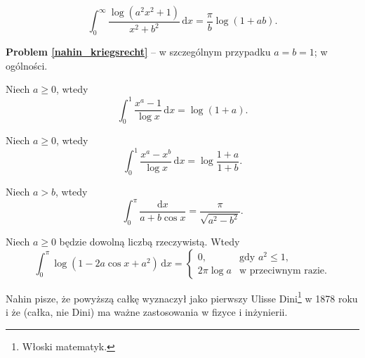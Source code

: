 \begin{problem}
    \label{nahin_kriegsrecht}
    \begin{equation}
        \int_0^\infty \frac{\log (a^2 x^2 + 1)}{x^2 + b^2} \,\mathrm{d}x = \frac \pi b \log (1 + ab).
    \end{equation}
\end{problem}

\textbf{Problem \ref{nahin_kriegsrecht}} -- \cite[s. 67]{nahin15} w szczególnym przypadku $a = b = 1$; \cite[s. 114, 375]{nahin15} w ogólności.

\begin{problem}
    Niech $a \ge 0$, wtedy
    \begin{equation}
        \int_0^1 \frac{x^a - 1}{\log x} \,\mathrm{d}x = \log(1+a).
    \end{equation}
\end{problem}

\begin{problem}
    Niech $a \ge 0$, wtedy
    \begin{equation}
        \int_0^1 \frac{x^a - x^b}{\log x} \,\mathrm{d}x = \log \frac{1+a}{1+b}.
    \end{equation}
\end{problem}

\begin{problem}
    Niech $a > b$, wtedy
    \begin{equation}
        \int_0^\pi \frac{\mathrm{d}x} {a + b \cos x} = \frac{\pi}{\sqrt{a^2 - b^2}}.
    \end{equation}
\end{problem}

\begin{problem}
    \label{nahin_dini}%
    Niech $a \ge 0$ będzie dowolną liczbą rzeczywistą.
    Wtedy
    \begin{equation}
        \int_0^\pi \log (1 - 2 a \cos x + a^2) \,\mathrm{d} x = \begin{cases}
            0, & \text{gdy } a^2 \le 1, \\
            2 \pi \log a & \textrm{w przeciwnym razie}.
        \end{cases}
    \end{equation}
\end{problem}

Nahin pisze, że powyższą całkę wyznaczył jako pierwszy Ulisse Dini\footnote{Włoski matematyk.} w 1878 roku i że (całka, nie Dini) ma ważne zastosowania w fizyce i inżynierii.
%

